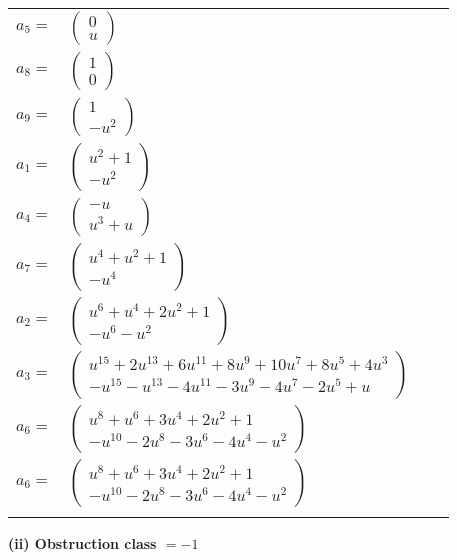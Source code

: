 \documentclass[1p]{elsarticle_modified}
\theoremstyle{definition}
\begin{document}
\begin{tabular}{m{7pt} m{180pt} m{7pt} m{180pt} }
\flushright $a_{5}=$&$\begin{pmatrix}0\\u\end{pmatrix}$ \\
\flushright $a_{8}=$&$\begin{pmatrix}1\\0\end{pmatrix}$ \\
\flushright $a_{9}=$&$\begin{pmatrix}1\\- u^2\end{pmatrix}$ \\
\flushright $a_{1}=$&$\begin{pmatrix}u^2+1\\- u^2\end{pmatrix}$ \\
\flushright $a_{4}=$&$\begin{pmatrix}- u\\u^3+u\end{pmatrix}$ \\
\flushright $a_{7}=$&$\begin{pmatrix}u^4+u^2+1\\- u^4\end{pmatrix}$ \\
\flushright $a_{2}=$&$\begin{pmatrix}u^6+u^4+2 u^2+1\\- u^6- u^2\end{pmatrix}$ \\
\flushright $a_{3}=$&$\begin{pmatrix}u^{15}+2 u^{13}+6 u^{11}+8 u^9+10 u^7+8 u^5+4 u^3\\- u^{15}- u^{13}-4 u^{11}-3 u^9-4 u^7-2 u^5+u\end{pmatrix}$ \\
\flushright $a_{6}=$&$\begin{pmatrix}u^8+u^6+3 u^4+2 u^2+1\\- u^{10}-2 u^8-3 u^6-4 u^4- u^2\end{pmatrix}$\\ \flushright $a_{6}=$&$\begin{pmatrix}u^8+u^6+3 u^4+2 u^2+1\\- u^{10}-2 u^8-3 u^6-4 u^4- u^2\end{pmatrix}$\\&\end{tabular}
\flushleft \textbf{(ii) Obstruction class $= -1$}\\~\\
\end{document}
